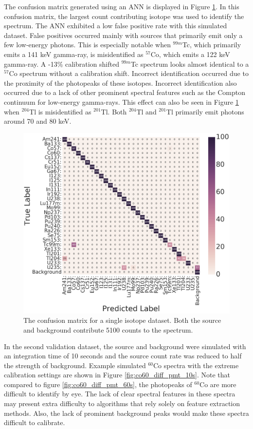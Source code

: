 \documentclass[tocnosub,noragright,centerchapter,12pt,fullpage]{uiucecethesis09}
\begin{document}
The confusion matrix generated using an ANN is displayed in Figure \ref{fig:conf_matrix_60s}. In this confusion matrix, the largest count contributing isotope was used to identify the spectrum. The ANN exhibited a low false positive rate with this simulated dataset. False positives occurred mainly with sources that primarily emit only a few low-energy photons. This is especially notable when $^{99m}$Tc, which primarily emits a 141 keV gamma-ray, is misidentified as $^{57}$Co, which emits a 122 keV gamma-ray. A -13\% calibration shifted  $^{99m}$Tc spectrum looks almost identical to a $^{57}$Co spectrum without a calibration shift. Incorrect identification occurred due to the proximity of the photopeaks of these isotopes. Incorrect identification also occurred due to a lack of other prominent spectral features such as the Compton continuum for low-energy gamma-rays. This effect can also be seen in Figure \ref{fig:conf_matrix_60s} when $^{204}$Tl is misidentified as $^{201}$Tl. Both $^{204}$Tl and $^{201}$Tl primarily emit photons around 70 and 80 keV.




\begin{figure}[H]
\centering
\includegraphics[width=0.9\linewidth]{images/conf_matrix_60s}
\caption{The confusion matrix for a single isotope dataset. Both the source and background contribute 5100 counts to the spectrum.}
\label{fig:conf_matrix_60s}
\end{figure}

In the second validation dataset, the source and background were simulated with an integration time of 10 seconds and the source count rate was reduced to half the strength of background. Example simulated $^{60}$Co spectra with the extreme calibration settings are shown in Figure \ref{fig:co60_diff_pmt_10s}. Note that compared to figure \ref{fig:co60_diff_pmt_60s}, the photopeaks of $^{60}$Co are more difficult to identify by eye. The lack of clear spectral features in these spectra may present extra difficulty to algorithms that rely solely on feature extraction methods. Also, the lack of prominent background peaks would make these spectra difficult to calibrate.
\end{document}
